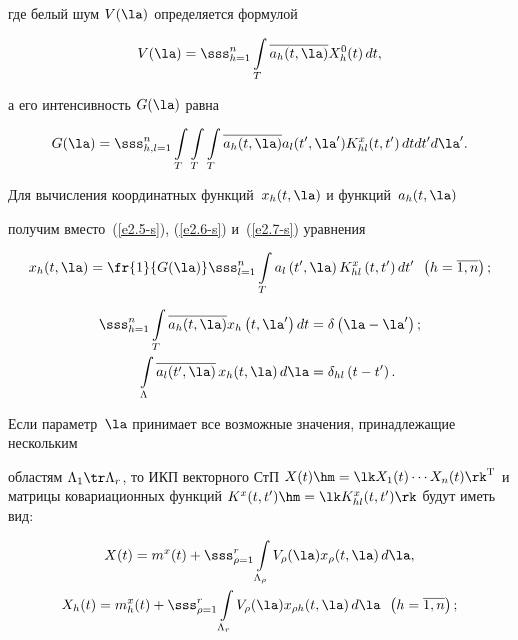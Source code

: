 где белый шум $V(\la)$  определяется формулой

    $$

    V(\la) = \sss_{h=1}^n \int\limits_T \overline{a_h (t,\la)} X_h^0 (t) \,dt,

    $$

а его интенсивность $G(\la)$ равна

    $$

    G(\la) = \sss_{h,l=1}^n \int\limits_T \int\limits_T\int\limits_T\overline{a_h (t,\la)} a_l 

(t',\la') K_{hl}^x (t,t') \,dtdt' d\la'.

$$

Для вычисления координатных функций~$x_h (t,\la)$ и функций~$a_h (t,\la)$ 

получим вместо~(\ref{e2.5-s}), (\ref{e2.6-s}) и~(\ref{e2.7-s}) уравнения

\begin{equation}

x_h (t,\la) =\fr{1}{G(\la)} \sss_{l=1}^n \int\limits_T a_l \left(t',\la\right) K_{hl}^x 

\left(t,t'\right) dt' \enskip \left(h=\overline{1,n}\right);\label{e2.14-s}

\end{equation}

   \begin{align}

    \sss_{h=1}^n \int\limits_T \overline{a_h(t,\la)} x_h \left(t, \la'\right) dt& = \delta \left(\la-\la'\right);\notag

\\

    \int\limits_\Lambda \overline{a_l(t',\la)} \,x_h (t, \la) \,d\la &= \delta_{hl} \left(t-t'\right).

    \label{e2.15-s}

    \end{align}



Если параметр~$\la$ принимает все возможные значения, принадлежащие нескольким 

областям $\Lambda_1\tr \Lambda_r$, то ИКП векторного СтП $X(t) \hm=\lk X_1(t) 

\cdots X_n(t)\rk^{\mathrm{T}}$ и матрицы ковариационных функций $K^x (t,t') \hm= \lk K_{hl}^x 

(t,t')\rk$  будут иметь вид:

  \begin{multline}

    X(t) = m^x (t) +\sss_{\rho =1}^r \int\limits_{\Lambda_\rho} V_\rho (\la) x_\rho 

(t,\la) \,d\la,

\\

 X_h(t) = m_h^x(t) +\sss_{\rho =1}^r \int\limits_{\Lambda_r} V_\rho (\la) x_{\rho 

h} (t,\la)\, d\la\enskip \left(h=\overline{1,n}\right);

\label{e2.16-s}

\end{multline}



